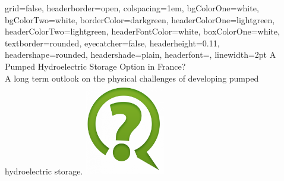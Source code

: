 \documentclass[a0paper,portrait]{baposter}
\begin{document}

\begin{poster}
{
grid=false,
headerborder=open, %
colspacing=1em, %
bgColorOne=white, %
bgColorTwo=white, %
borderColor=darkgreen, %
headerColorOne=lightgreen, %
headerColorTwo=lightgreen, %
headerFontColor=white, %
boxColorOne=white, %
textborder=rounded, %
eyecatcher=false, %
headerheight=0.11\textheight, %
headershape=rounded, %
headershade=plain,
headerfont=\Large\textsf, %
linewidth=2pt %
}
{}
%
%
{
\textsf %
{A Pumped Hydroelectric Storage Option in France?
}
} %
{\sf\vspace{0.5em}\\
A long term outlook on the physical challenges of developing pumped hydroelectric storage.
}
{\includegraphics[width=35mm,scale=0.35]{favpng_question-mark-logo-information}} %



\end{poster}
\end{document}
